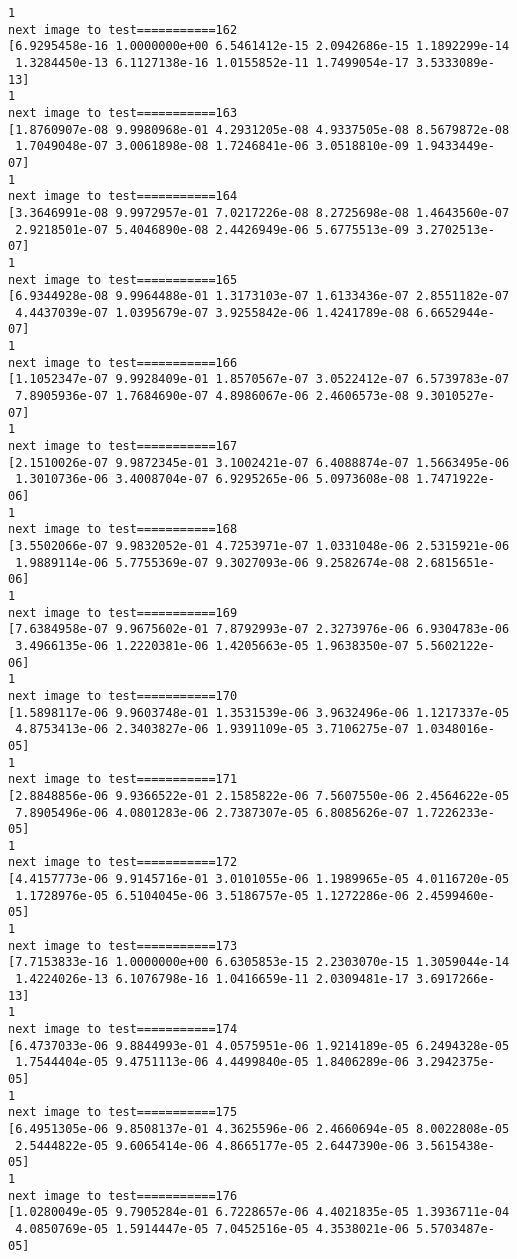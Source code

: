 \documentclass[11pt]{article}
\begin{document}
\begin{Verbatim}[commandchars=\\\{\}]
1
next image to test===========162
[6.9295458e-16 1.0000000e+00 6.5461412e-15 2.0942686e-15 1.1892299e-14
 1.3284450e-13 6.1127138e-16 1.0155852e-11 1.7499054e-17 3.5333089e-13]
1
next image to test===========163
[1.8760907e-08 9.9980968e-01 4.2931205e-08 4.9337505e-08 8.5679872e-08
 1.7049048e-07 3.0061898e-08 1.7246841e-06 3.0518810e-09 1.9433449e-07]
1
next image to test===========164
[3.3646991e-08 9.9972957e-01 7.0217226e-08 8.2725698e-08 1.4643560e-07
 2.9218501e-07 5.4046890e-08 2.4426949e-06 5.6775513e-09 3.2702513e-07]
1
next image to test===========165
[6.9344928e-08 9.9964488e-01 1.3173103e-07 1.6133436e-07 2.8551182e-07
 4.4437039e-07 1.0395679e-07 3.9255842e-06 1.4241789e-08 6.6652944e-07]
1
next image to test===========166
[1.1052347e-07 9.9928409e-01 1.8570567e-07 3.0522412e-07 6.5739783e-07
 7.8905936e-07 1.7684690e-07 4.8986067e-06 2.4606573e-08 9.3010527e-07]
1
next image to test===========167
[2.1510026e-07 9.9872345e-01 3.1002421e-07 6.4088874e-07 1.5663495e-06
 1.3010736e-06 3.4008704e-07 6.9295265e-06 5.0973608e-08 1.7471922e-06]
1
next image to test===========168
[3.5502066e-07 9.9832052e-01 4.7253971e-07 1.0331048e-06 2.5315921e-06
 1.9889114e-06 5.7755369e-07 9.3027093e-06 9.2582674e-08 2.6815651e-06]
1
next image to test===========169
[7.6384958e-07 9.9675602e-01 7.8792993e-07 2.3273976e-06 6.9304783e-06
 3.4966135e-06 1.2220381e-06 1.4205663e-05 1.9638350e-07 5.5602122e-06]
1
next image to test===========170
[1.5898117e-06 9.9603748e-01 1.3531539e-06 3.9632496e-06 1.1217337e-05
 4.8753413e-06 2.3403827e-06 1.9391109e-05 3.7106275e-07 1.0348016e-05]
1
next image to test===========171
[2.8848856e-06 9.9366522e-01 2.1585822e-06 7.5607550e-06 2.4564622e-05
 7.8905496e-06 4.0801283e-06 2.7387307e-05 6.8085626e-07 1.7226233e-05]
1
next image to test===========172
[4.4157773e-06 9.9145716e-01 3.0101055e-06 1.1989965e-05 4.0116720e-05
 1.1728976e-05 6.5104045e-06 3.5186757e-05 1.1272286e-06 2.4599460e-05]
1
next image to test===========173
[7.7153833e-16 1.0000000e+00 6.6305853e-15 2.2303070e-15 1.3059044e-14
 1.4224026e-13 6.1076798e-16 1.0416659e-11 2.0309481e-17 3.6917266e-13]
1
next image to test===========174
[6.4737033e-06 9.8844993e-01 4.0575951e-06 1.9214189e-05 6.2494328e-05
 1.7544404e-05 9.4751113e-06 4.4499840e-05 1.8406289e-06 3.2942375e-05]
1
next image to test===========175
[6.4951305e-06 9.8508137e-01 4.3625596e-06 2.4660694e-05 8.0022808e-05
 2.5444822e-05 9.6065414e-06 4.8665177e-05 2.6447390e-06 3.5615438e-05]
1
next image to test===========176
[1.0280049e-05 9.7905284e-01 6.7228657e-06 4.4021835e-05 1.3936711e-04
 4.0850769e-05 1.5914447e-05 7.0452516e-05 4.3538021e-06 5.5703487e-05]

\end{Verbatim}
\end{document}
